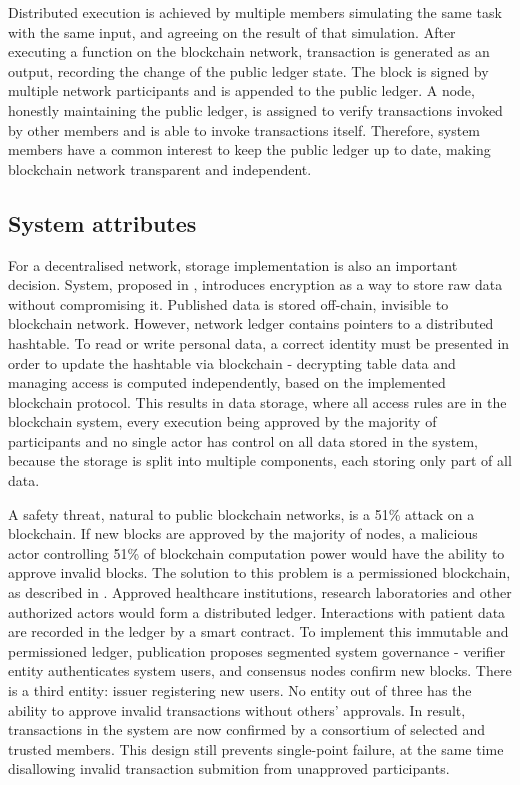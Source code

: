 \documentclass[12pt]{article}
\begin{document}
    Distributed execution is achieved by multiple members simulating the same task with the same input, and agreeing on the result of that simulation. After executing a function on the blockchain network, transaction is generated as an output, recording the change of the public ledger state. The block is signed by multiple network participants and is appended to the public ledger. A node, honestly maintaining the public ledger, is assigned to verify transactions invoked by other members and is able to invoke transactions itself. Therefore, system members have a common interest to keep the public ledger up to date, making blockchain network transparent and independent.

    \subsection{System attributes}
    For a decentralised network, storage implementation is also an important decision. System, proposed in \cite{privacy}, introduces encryption as a way to store raw data without compromising it. Published data is stored off-chain, invisible to blockchain network. However, network ledger contains pointers to a distributed hashtable. To read or write personal data, a correct identity must be presented in order to update the hashtable via blockchain - decrypting table data and managing access is computed independently, based on the implemented blockchain protocol. This results in data storage, where all access rules are in the blockchain system, every execution being approved by the majority of participants and no single actor has control on all data stored in the system, because the storage is split into multiple components, each storing only part of all data.

    A safety threat, natural to public blockchain networks, is a 51\% attack on a blockchain. If new blocks are approved by the majority of nodes, a malicious actor controlling 51\% of blockchain computation power would have the ability to approve invalid blocks. The solution to this problem is a permissioned blockchain, as described in \cite{permissioned}. Approved healthcare institutions, research laboratories and other authorized actors would form a distributed ledger. Interactions with patient data are recorded in the ledger by a smart contract. To implement this immutable and permissioned ledger,  publication proposes segmented system governance - verifier entity authenticates system users, and consensus nodes confirm new blocks. There is a third entity: issuer registering new users. No entity out of three has the ability to approve invalid transactions without others' approvals. In result, transactions in the system are now confirmed by a consortium of selected and trusted members. This design still prevents single-point failure, at the same time disallowing invalid transaction submition from unapproved participants.
\end{document}
